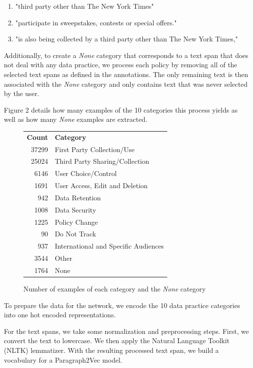 \documentclass[12pt, letterpaper]{article}
\begin{document}
\begin{enumerate}
	\item "third party other than The New York Times"
	\item "participate in sweepstakes, contests or special offers."
	\item "is also being collected by a third party other than The New York Times,"
\end{enumerate}

Additionally, to create a \textit{None} category that corresponds to a text span that does not deal with any data practice, we process each policy by removing all of the selected text spans as defined in the annotations. The only remaining text is then associated with the \textit{None} category and only contains text that was never selected by the user.

Figure 2 details how many examples of the 10 categories this process yields as well as how many \textit{None} examples are extracted.

\begin{figure}[h]
	\begin{tabular}{rl}
		\textbf{Count} & \textbf{Category} \\
		37299 & First Party Collection/Use \\ 
		25024 & Third Party Sharing/Collection \\
		6146 & User Choice/Control \\
		1691 & User Access, Edit and Deletion \\
		942 & Data Retention \\
		1008 & Data Security \\
		1225 & Policy Change \\
		90 & Do Not Track \\
		937 & International and Specific Audiences \\
		3544 & Other \\
		1764 & None \\
	\end{tabular}
	\caption{Number of examples of each category and the \textit{None} category}
\end{figure}

To prepare the data for the network, we encode the 10 data practice categories into one hot encoded representations.  

For the text spans, we take some normalization and preprocessing steps. First, we convert the text to lowercase. We then apply the Natural Language Toolkit (NLTK) lemmatizer. With the resulting processed text span, we build a vocabulary for a Paragraph2Vec model.
\end{document}
